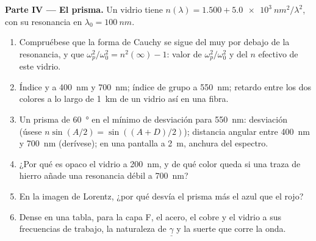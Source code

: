 \begin{problem}
\medskip
\noindent\textbf{Parte IV --- El prisma.}
Un vidrio tiene $n(\lambda) = 1.500 + \qty{5.0e3}{nm^2}/\lambda^2$, con su resonancia
en $\lambda_0 = \qty{100}{nm}$.
\begin{enumerate}[resume]
  \item Compruébese que la forma de Cauchy se sigue del  muy
        por debajo de la resonancia, y que $\omega_p^2/\omega_0^2 = n^2(\infty) - 1$: valor
        de $\omega_p^2/\omega_0^2$ y del $n$ efectivo de este vidrio.
  \item Índice y  a \qty{400}{nm} y \qty{700}{nm}; índice
        de grupo a \qty{550}{nm}; retardo entre los dos colores a lo largo de
        \qty{1}{km} de un vidrio así en una fibra.
  \item Un prisma de \qty{60}{\degree} en el mínimo de desviación para \qty{550}{nm}:
        desviación (úsese $n\sin(A/2) = \sin((A + D)/2)$); distancia angular
        entre \qty{400}{nm} y \qty{700}{nm} (derívese); en una pantalla a
        \qty{2}{m}, anchura del espectro.
  \item ¿Por qué es opaco el vidrio a \qty{200}{nm}, y de qué color queda
        si una traza de hierro añade una resonancia débil a \qty{700}{nm}?
  \item En la imagen de Lorentz, ¿por qué desvía el prisma más el azul que el rojo?
  \item Dense en una tabla, para la capa F, el acero, el cobre y
        el vidrio a sus frecuencias de trabajo, la naturaleza de
        $\underline\gamma$ y la suerte que corre la onda.
\end{enumerate}
\end{problem}
